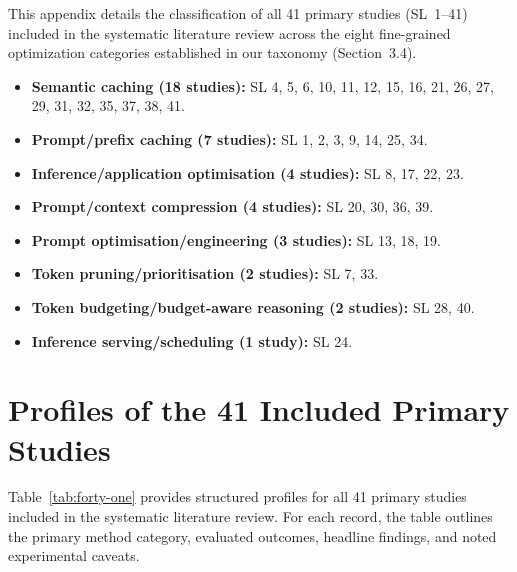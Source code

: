 \IfFileExists{jair.cls}{\documentclass{jair}}{\documentclass[manuscript,nonacm,screen]{acmart}}
\begin{document}
This appendix details the classification of all 41 primary studies (SL~1--41) included in the systematic literature review across the eight fine-grained optimization categories established in our taxonomy (Section~3.4).

\begin{itemize}[leftmargin=1.5em]
\item \textbf{Semantic caching (18 studies):} SL 4, 5, 6, 10, 11, 12, 15, 16, 21, 26, 27, 29, 31, 32, 35, 37, 38, 41.
\item \textbf{Prompt/prefix caching (7 studies):} SL 1, 2, 3, 9, 14, 25, 34.
\item \textbf{Inference/application optimisation (4 studies):} SL 8, 17, 22, 23.
\item \textbf{Prompt/context compression (4 studies):} SL 20, 30, 36, 39.
\item \textbf{Prompt optimisation/engineering (3 studies):} SL 13, 18, 19.
\item \textbf{Token pruning/prioritisation (2 studies):} SL 7, 33.
\item \textbf{Token budgeting/budget-aware reasoning (2 studies):} SL 28, 40.
\item \textbf{Inference serving/scheduling (1 study):} SL 24.
\end{itemize}

\clearpage
\section{Profiles of the 41 Included Primary Studies}

Table~\ref{tab:forty-one} provides structured profiles for all 41 primary studies included in the systematic literature review. For each record, the table outlines the primary method category, evaluated outcomes, headline findings, and noted experimental caveats.
\end{document}
